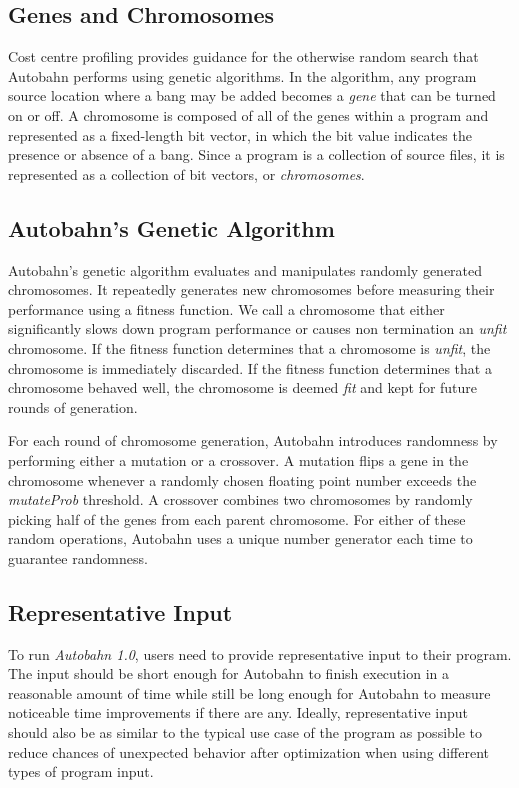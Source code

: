 \documentclass[format=sigplan]{acmart}
\newcommand{\unfit}[0]{\textit{unfit}}
\newcommand{\Ao}[0]{\textit{Autobahn 1.0}}
\newcommand{\fit}[0]{\textit{fit}}
\begin{document}

\subsection{Genes and Chromosomes}

Cost centre profiling provides guidance for the otherwise random search 
that Autobahn performs using genetic algorithms. In the algorithm, any 
program source location where a bang may be added becomes a \textit{gene} that can 
be turned on or off. A chromosome is composed of all of the genes within a 
program and represented as a fixed-length bit vector, in which the bit value 
indicates the presence or absence of a bang. Since a program is a collection of source files, it is represented as a collection of bit vectors, or \textit{chromosomes}.

\subsection{Autobahn's Genetic Algorithm}

Autobahn's genetic algorithm evaluates and manipulates randomly generated chromosomes. It repeatedly generates new chromosomes before measuring their performance using a fitness function. We call a chromosome that either significantly slows down program performance or causes non termination an \unfit{} chromosome. If the fitness function determines that a chromosome is \unfit{}, the chromosome is immediately discarded. If the fitness function determines that a chromosome behaved well, the chromosome is deemed \fit{} and kept for future rounds of generation. 

For each round of chromosome generation, Autobahn introduces randomness by performing either a mutation or a crossover. A mutation flips a gene in the chromosome whenever a randomly chosen floating point number exceeds the \textit{mutateProb} threshold. A crossover combines two chromosomes by randomly picking half of the genes from each parent chromosome. For either of these random operations, Autobahn uses a unique number generator each time to guarantee randomness. 

\subsection{Representative Input}

To run \Ao{}, users need to provide representative input to their program. The input should be short enough for Autobahn to finish execution in a reasonable amount of time while still be long enough for Autobahn to measure noticeable time improvements if there are any. Ideally, representative input should also be as similar to the typical use case of the program as possible to reduce chances of unexpected behavior after optimization when using different types of program input.
\end{document}

